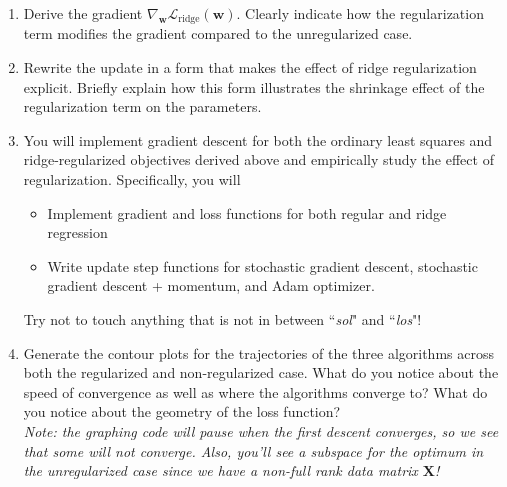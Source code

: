 \documentclass[submit]{harvardml}
\begin{document}
\begin{problem}
\begin{enumerate}
\item Derive the gradient $\nabla_{\mathbf w}\mathcal L_\text{ridge}(\mathbf w)$. Clearly indicate how the regularization term modifies the gradient compared to the unregularized case.


\item Rewrite the update in a form that makes the effect of ridge regularization
explicit. Briefly explain how this form illustrates the shrinkage effect of the
regularization term on the parameters.

\item You will implement gradient descent for both the ordinary least squares and
ridge-regularized objectives derived above and empirically study the effect of
regularization. Specifically, you will

\begin{itemize}
    \item Implement gradient and loss functions for both regular and ridge regression
    \item Write update step functions for stochastic gradient descent, stochastic gradient descent + momentum, and Adam optimizer.
\end{itemize}

Try not to touch anything that is not in between ``\textit{sol}" and ``\textit{los}"!


\item Generate the contour plots for the trajectories of the three algorithms across both the regularized and non-regularized case. What do you notice about the speed of convergence as well as where the algorithms converge to? What do you notice about the geometry of the loss function?\\
\textit{Note: the graphing code will pause when the first descent converges, so we see that some will not converge. Also, you'll see a subspace for the optimum in the unregularized case since we have a non-full rank data matrix $\mathbf X$!}

\end{enumerate}
\end{problem}

\pagebreak
\end{document}
